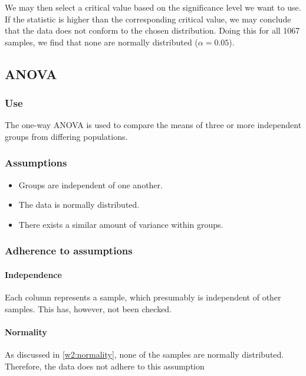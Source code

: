 \begin{center}

\end{center}

\par We may then select a critical value based on the significance level we want to use.
If the statistic is higher than the corresponding critical value, we may conclude that the data does not conform to the chosen distribution.
Doing this for all 1067 samples, we find that none are normally distributed ($\alpha = 0.05$).

\subsection{ANOVA}

\subsubsection{Use}
The one-way ANOVA is used to compare the means of three or more independent groups from differing populations.

\subsubsection{Assumptions}
\begin{itemize}
    \item Groups are independent of one another.
    \item The data is normally distributed.
    \item There exists a similar amount of variance within groups.
\end{itemize}

\subsubsection{Adherence to assumptions}
\paragraph{Independence}
Each column represents a sample, which presumably is independent of other samples.
This has, however, not been checked.

\paragraph{Normality}
As discussed in \ref{w2:normality}, none of the samples are normally distributed.
Therefore, the data does not adhere to this assumption


